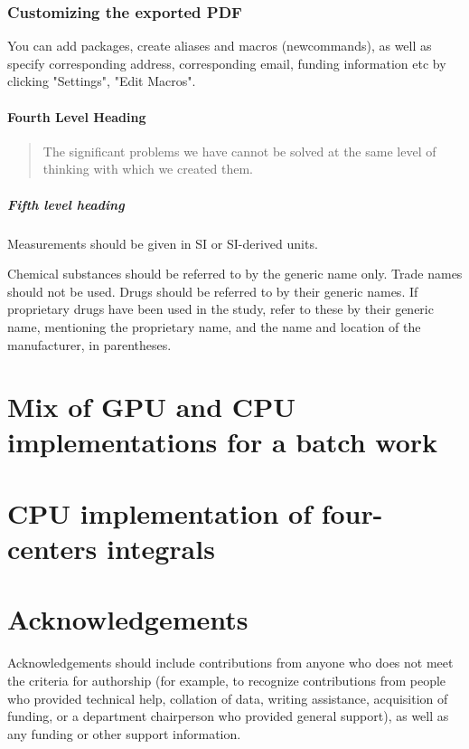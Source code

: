 \documentclass[num-refs]{wiley-article}
\begin{document}
\subsubsection{Customizing the exported PDF}
You can add packages, create aliases and macros (newcommands), as well as specify corresponding address, corresponding email, funding information etc by clicking "Settings", "Edit Macros".

\paragraph{Fourth Level Heading}

\begin{quote}
The significant problems we have cannot be solved at the same level of thinking with which we created them.
\end{quote}


\subparagraph{Fifth level heading}
Measurements should be given in SI or SI-derived units.


Chemical substances should be referred to by the generic name only. Trade names should not be used. Drugs should be referred to by their generic names. If proprietary drugs have been used in the study, refer to these by their generic name, mentioning the proprietary name, and the name and location of the manufacturer, in parentheses.


% 
% 
% 
% 
%

\section{Mix of GPU and CPU implementations for a batch work}



% 
% 
% 
%

\section{CPU implementation of four-centers integrals}


\section*{Acknowledgements}
Acknowledgements should include contributions from anyone who does not meet the criteria for authorship (for example, to recognize contributions from people who provided technical help, collation of data, writing assistance, acquisition of funding, or a department chairperson who provided general support), as well as any funding or other support information.
\end{document}
